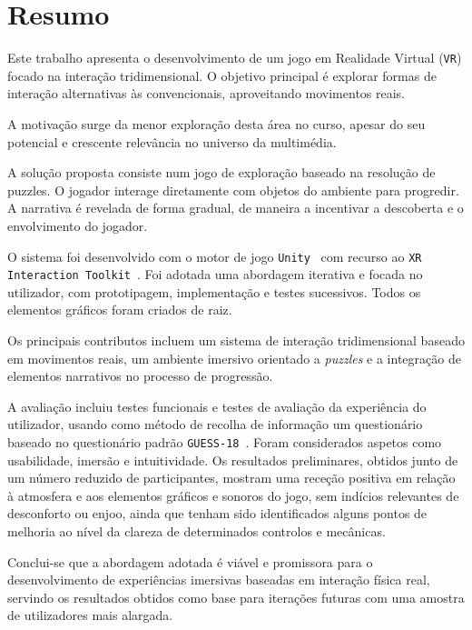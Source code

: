 \documentclass[a4paper, 12pt]{book}
\begin{document}
\frontmatter
\pagestyle{plain}
\fazerCapa

\chapter{Resumo}
Este trabalho apresenta o desenvolvimento de um jogo em Realidade Virtual (\texttt{VR}) focado 
na interação tridimensional. O objetivo principal é explorar formas de 
interação alternativas às convencionais, aproveitando movimentos reais.
\par
A motivação surge da menor exploração desta área no curso, apesar 
do seu potencial e crescente relevância no universo da multimédia.
\par
A solução proposta consiste num jogo de exploração baseado na resolução de 
puzzles. O jogador interage diretamente com objetos do ambiente para progredir. 
A narrativa é revelada de forma gradual, de maneira a incentivar a descoberta e 
o envolvimento do jogador.
\par
O sistema foi desenvolvido com o motor de jogo \texttt{Unity}~\cite{unity} com recurso ao 
\texttt{XR Interaction Toolkit}~\cite{xri}. 
Foi adotada uma abordagem iterativa e focada no utilizador, com prototipagem, implementação e 
testes sucessivos. Todos os elementos gráficos foram criados de raiz.
\par
Os principais contributos incluem um sistema de interação tridimensional baseado 
em movimentos reais, um ambiente imersivo orientado a \textit{puzzles} e a integração de 
elementos narrativos no processo de progressão.
\par
A avaliação incluiu testes funcionais e testes de avaliação da experiência do utilizador, 
usando como método de recolha de informação um questionário baseado no questionário padrão 
\texttt{GUESS-18}~\cite{guess18}. 
Foram considerados aspetos como usabilidade, imersão e intuitividade. 
Os resultados preliminares, obtidos junto de um número reduzido de 
participantes, mostram uma receção positiva em relação à atmosfera e aos elementos gráficos 
e sonoros do jogo, sem indícios relevantes de desconforto ou enjoo, ainda 
que tenham sido identificados alguns pontos de melhoria ao nível da 
clareza de determinados controlos e mecânicas.
\par
Conclui-se que a abordagem adotada é viável e promissora para o 
desenvolvimento de experiências imersivas baseadas em interação física 
real, servindo os resultados obtidos como base para iterações futuras com 
uma amostra de utilizadores mais alargada.
\end{document}
